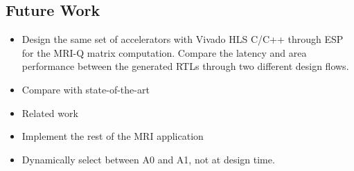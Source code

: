 \subsection{Future Work}
\begin{itemize}

\item Design the same set of accelerators with Vivado HLS C/C++ through ESP for
  the MRI-Q matrix computation. Compare the latency and area performance between
  the generated RTLs through two different design flows.

\item Compare with state-of-the-art

\item Related work

\item Implement the rest of the MRI application

\item Dynamically select between A0 and A1, not at design time.
  
\end{itemize}
